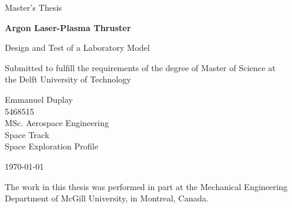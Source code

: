 \begin{titlepage}
    \thispagestyle{empty}
    \sffamily
    \vspace*{3cm}
    {\large \color{cyan}
        Master's Thesis
    }

    \vspace{0.3cm}
    {\LARGE \textbf{Argon Laser-Plasma Thruster}}

    {\Large Design and Test of a Laboratory Model}

    \vspace{0.2cm}
    {\large 
        Submitted to fulfill the requirements of the degree of Master of Science at\\the Delft University of Technology

        \vspace{1cm}
        Emmanuel Duplay\\
        5468515 \\
        MSc. Aerospace Engineering \\
        Space Track \\
        Space Exploration Profile

        \vspace{0.5cm}
        \today
    }
    \vfill
    {   
        The work in this thesis was performed in part at the Mechanical Engineering Department of McGill University, in Montreal, Canada.
        
}
\end{titlepage}
